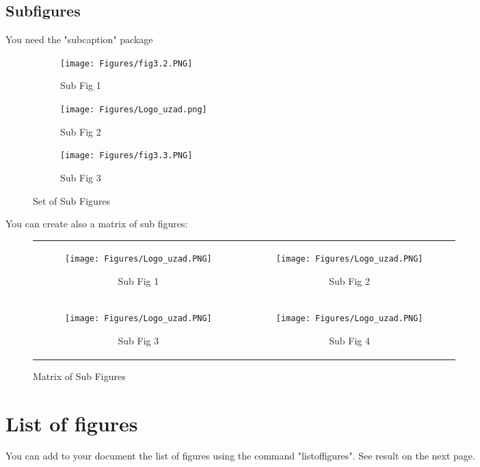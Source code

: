 \subsection{Subfigures}
You need the "subcaption" package
\begin{figure}[H]
	\begin{subfigure}{.3\textwidth}
		\centering
		\texttt{[image: Figures/fig3.2.PNG]}
		\caption{Sub Fig 1}
	\end{subfigure}
	\begin{subfigure}{.3\textwidth}
		\centering
		\texttt{[image: Figures/Logo\_uzad.png]}
		\caption{Sub Fig 2}
	\end{subfigure}
	\begin{subfigure}{.3\textwidth}
		\centering
		\texttt{[image: Figures/fig3.3.PNG]}
		\caption{Sub Fig 3}
	\end{subfigure}
	\caption{Set of Sub Figures}
\end{figure}
You can create also a matrix of sub figures:
\begin{figure}[H]
	\centering
	\begin{tabular}{cc}
		\begin{subfigure}{.3\textwidth}
			\centering
			\texttt{[image: Figures/Logo\_uzad.PNG]}
			\caption{Sub Fig 1}
		\end{subfigure} 
		&  
		\begin{subfigure}{.3\textwidth}
			\centering
			\texttt{[image: Figures/Logo\_uzad.PNG]}
			\caption{Sub Fig 2}
		\end{subfigure} 
		\\
		\begin{subfigure}{.3\textwidth}
			\centering
			\texttt{[image: Figures/Logo\_uzad.PNG]}
			\caption{Sub Fig 3}
		\end{subfigure}
		& 
		\begin{subfigure}{.3\textwidth}
			\centering
			\texttt{[image: Figures/Logo\_uzad.PNG]}
			\caption{Sub Fig 4}
		\end{subfigure}
	\end{tabular}
	\caption{Matrix of Sub Figures}
	\label{fig: mat_fig}	
\end{figure}

\section{List of figures}
You can add to your document the list of figures using the command "listoffigures". See result on the next page.
\listoffigures
